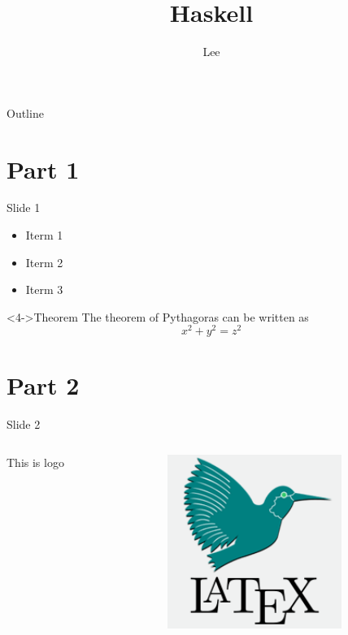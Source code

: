 \documentclass{beamer}
\title{Haskell}
\author{Lee}
\begin{document}
\begin{frame}
  \maketitle
\end{frame}

\begin{frame}{Outline}
  \tableofcontents
\end{frame}

\section{Part 1}

\begin{frame}[t]{Slide 1}
  \begin{itemize}
  \item<1-> Iterm 1
  \item<2-> Iterm 2
  \item<3-> Iterm 3
  \end{itemize}
  \begin{block}<4->{Theorem}
    The theorem of Pythagoras can be written as
  $$ x^2 + y^2 = z^2$$
  \end{block}
\end{frame}

\section{Part 2}
\begin{frame}{Slide 2}
  \begin{columns}
    \begin{column}{0.5\textwidth}
      This is logo
    \end{column}
    \begin{column}{0.5\textwidth}
  \begin{center}
    \includegraphics[width=0.7\textwidth]{logo.png}
  \end{center}
    \end{column}
  \end{columns}
\end{frame}
\end{document}

